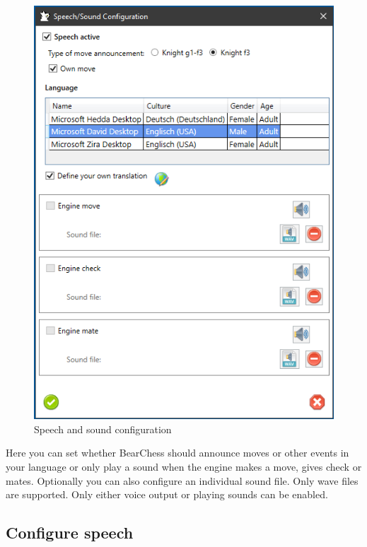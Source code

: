\documentclass[11pt,a4paper]{article}
\begin{document}
	\begin{figure}[H]
		\centering
		\includegraphics[scale=1.0]{Sounds1.png}
		\caption{Speech and sound configuration}
		\label{fig:Sounds1}
	\end{figure}	
	
	Here you can set whether BearChess should announce moves or other events in your language or only play a sound when the engine makes a move, gives check or mates. Optionally you can also configure an individual sound file. Only wave files are supported. Only either voice output or playing sounds can be enabled.
	
	\subsection{Configure speech}
	
\end{document}
